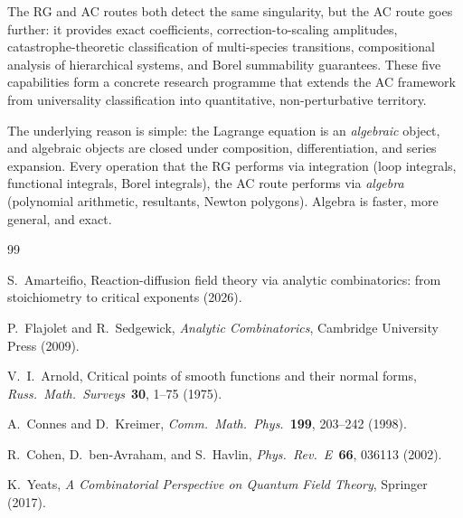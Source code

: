 \documentclass[11pt,a4paper]{article}
\theoremstyle{definition}
\begin{document}
The RG and AC routes both detect the same singularity, but the AC route
goes further: it provides exact coefficients, correction-to-scaling
amplitudes, catastrophe-theoretic classification of multi-species
transitions, compositional analysis of hierarchical systems, and Borel
summability guarantees. These five capabilities form a concrete research
programme that extends the AC framework from universality classification
into quantitative, non-perturbative territory.

The underlying reason is simple: the Lagrange equation is an
\emph{algebraic} object, and algebraic objects are closed under
composition, differentiation, and series expansion. Every operation
that the RG performs via integration (loop integrals, functional
integrals, Borel integrals), the AC route performs via
\emph{algebra} (polynomial arithmetic, resultants, Newton polygons).
Algebra is faster, more general, and exact.


\begin{thebibliography}{99}

S.~Amarteifio,
\newblock Reaction-diffusion field theory via analytic combinatorics:
from stoichiometry to critical exponents (2026).

P.~Flajolet and R.~Sedgewick,
\newblock \emph{Analytic Combinatorics}, Cambridge University Press (2009).

V.~I.~Arnold,
\newblock Critical points of smooth functions and their normal forms,
\newblock \emph{Russ.\ Math.\ Surveys}\ \textbf{30}, 1--75 (1975).

A.~Connes and D.~Kreimer,
\newblock \emph{Comm.\ Math.\ Phys.}\ \textbf{199}, 203--242 (1998).

R.~Cohen, D.~ben-Avraham, and S.~Havlin,
\newblock \emph{Phys.\ Rev.\ E}\ \textbf{66}, 036113 (2002).

K.~Yeats,
\newblock \emph{A Combinatorial Perspective on Quantum Field Theory},
Springer (2017).

\end{thebibliography}
\end{document}
